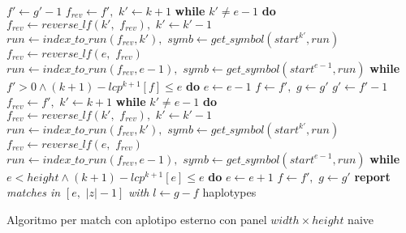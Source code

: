 \begin{algorithm}
\begin{algorithmic}[1]
    \State $f'\gets g'-1$
    \State $f_{rev}\gets f',\,\,k'\gets k+1$
    \State \textbf{while} $k'\neq e-1$ \textbf{do} $f_{rev}\gets reverse\_lf(k',
    \,\,f_{rev}),\,\,k'\gets k'-1$ 
    \State $run\gets index\_to\_run(f_{rev},k'),\,\,symb\gets
    get\_symbol(start^{k'}, 
    run)$ 
    \State $f_{rev}\gets reverse\_lf(e, \,\,f_{rev})$
    \State $run\gets index\_to\_run(f_{rev}, e-1),\,\,symb\gets
    get\_symbol(start^{e-1}, run)$ 
    \EndWhile
    \EndIf
    \State \textbf{while} $f'>0\land (k+1)-lcp^{k+1}[f]\leq e$ \textbf{do}
    $e\gets e-1$ 
    \State $f\gets f',\,\,g\gets g'$
    \Else
    \State $g'\gets f'-1$
    \State $f_{rev}\gets f',\,\,k'\gets k+1$
    \State \textbf{while} $k'\neq e-1$ \textbf{do} $f_{rev}\gets reverse\_lf(k',
    \,\,f_{rev}),\,\,k'\gets k'-1$ 
    \State $run\gets index\_to\_run(f_{rev},k'),\,\,symb\gets
    get\_symbol(start^{k'}, 
    run)$ 
    \State $f_{rev}\gets reverse\_lf(e, \,\,f_{rev})$
    \State $run\gets index\_to\_run(f_{rev},e-1),\,\,symb\gets
    get\_symbol(start^{e-1}, run)$ 
    \EndWhile
    \EndIf
    \State \textbf{while} $e<height\land (k+1)-lcp^{k+1}[e]\leq e$ \textbf{do}
    $e\gets e+1$  
    \State $f\gets f',\,\,g\gets g'$
    \EndIf
    \EndIf
    \EndFor
    \State \textbf{report} \textit{matches in} $[e,\,\, |z|-1]$ \textit{with}
    $l\gets g-f$ haplotypes   
    \EndIf
    \EndFunction
  \end{algorithmic}
  \caption{Algoritmo per match con aplotipo esterno con panel $width\times
  height$ naive}
  \label{algo:matchpanel}
\end{algorithm}


